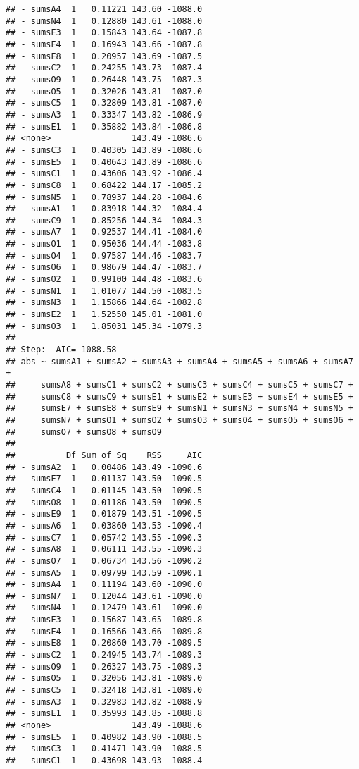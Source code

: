 \documentclass[,man,floatsintext]{apa6}
\begin{document}
\begin{verbatim}
## - sumsA4  1   0.11221 143.60 -1088.0
## - sumsN4  1   0.12880 143.61 -1088.0
## - sumsE3  1   0.15843 143.64 -1087.8
## - sumsE4  1   0.16943 143.66 -1087.8
## - sumsE8  1   0.20957 143.69 -1087.5
## - sumsC2  1   0.24255 143.73 -1087.4
## - sumsO9  1   0.26448 143.75 -1087.3
## - sumsO5  1   0.32026 143.81 -1087.0
## - sumsC5  1   0.32809 143.81 -1087.0
## - sumsA3  1   0.33347 143.82 -1086.9
## - sumsE1  1   0.35882 143.84 -1086.8
## <none>                143.49 -1086.6
## - sumsC3  1   0.40305 143.89 -1086.6
## - sumsE5  1   0.40643 143.89 -1086.6
## - sumsC1  1   0.43606 143.92 -1086.4
## - sumsC8  1   0.68422 144.17 -1085.2
## - sumsN5  1   0.78937 144.28 -1084.6
## - sumsA1  1   0.83918 144.32 -1084.4
## - sumsC9  1   0.85256 144.34 -1084.3
## - sumsA7  1   0.92537 144.41 -1084.0
## - sumsO1  1   0.95036 144.44 -1083.8
## - sumsO4  1   0.97587 144.46 -1083.7
## - sumsO6  1   0.98679 144.47 -1083.7
## - sumsO2  1   0.99100 144.48 -1083.6
## - sumsN1  1   1.01077 144.50 -1083.5
## - sumsN3  1   1.15866 144.64 -1082.8
## - sumsE2  1   1.52550 145.01 -1081.0
## - sumsO3  1   1.85031 145.34 -1079.3
## 
## Step:  AIC=-1088.58
## abs ~ sumsA1 + sumsA2 + sumsA3 + sumsA4 + sumsA5 + sumsA6 + sumsA7 + 
##     sumsA8 + sumsC1 + sumsC2 + sumsC3 + sumsC4 + sumsC5 + sumsC7 + 
##     sumsC8 + sumsC9 + sumsE1 + sumsE2 + sumsE3 + sumsE4 + sumsE5 + 
##     sumsE7 + sumsE8 + sumsE9 + sumsN1 + sumsN3 + sumsN4 + sumsN5 + 
##     sumsN7 + sumsO1 + sumsO2 + sumsO3 + sumsO4 + sumsO5 + sumsO6 + 
##     sumsO7 + sumsO8 + sumsO9
## 
##          Df Sum of Sq    RSS     AIC
## - sumsA2  1   0.00486 143.49 -1090.6
## - sumsE7  1   0.01137 143.50 -1090.5
## - sumsC4  1   0.01145 143.50 -1090.5
## - sumsO8  1   0.01186 143.50 -1090.5
## - sumsE9  1   0.01879 143.51 -1090.5
## - sumsA6  1   0.03860 143.53 -1090.4
## - sumsC7  1   0.05742 143.55 -1090.3
## - sumsA8  1   0.06111 143.55 -1090.3
## - sumsO7  1   0.06734 143.56 -1090.2
## - sumsA5  1   0.09799 143.59 -1090.1
## - sumsA4  1   0.11194 143.60 -1090.0
## - sumsN7  1   0.12044 143.61 -1090.0
## - sumsN4  1   0.12479 143.61 -1090.0
## - sumsE3  1   0.15687 143.65 -1089.8
## - sumsE4  1   0.16566 143.66 -1089.8
## - sumsE8  1   0.20860 143.70 -1089.5
## - sumsC2  1   0.24945 143.74 -1089.3
## - sumsO9  1   0.26327 143.75 -1089.3
## - sumsO5  1   0.32056 143.81 -1089.0
## - sumsC5  1   0.32418 143.81 -1089.0
## - sumsA3  1   0.32983 143.82 -1088.9
## - sumsE1  1   0.35993 143.85 -1088.8
## <none>                143.49 -1088.6
## - sumsE5  1   0.40982 143.90 -1088.5
## - sumsC3  1   0.41471 143.90 -1088.5
## - sumsC1  1   0.43698 143.93 -1088.4

\end{verbatim}
\end{document}
